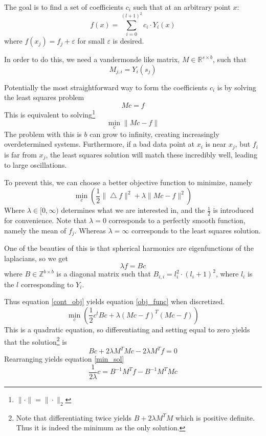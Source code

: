 \documentclass[12pt,a4paper]{article}
\newcommand{\eps}{\varepsilon}
\newcommand{\lap}{\bigtriangleup}
\begin{document}
The goal is to find a set of coefficients $c_i$ such that at an arbitrary point $x$:
\[
    f(x) = \sum_{i=0}^{(l+1)^2} c_i \cdot Y_i(x)
\]
where $f(x_j) = f_j + \eps$ for small $\eps$ is desired.

In order to do this, we need a vandermonde like matrix, $M \in \mathbb{R}^ {s \times b}$, such that
\[
    M_{j,i} = Y_i(s_j)
\]

Potentially the most straightforward way to form the coefficients $c_i$ is by solving
the least squares problem
\[
    M c = f
\]
This is equivalent to solving\footnote{$\|\cdot\| = \|\cdot\|_2$}
\[
    \min_c \| M c - f \|
\]
The problem with this is $b$ can grow to infinity, creating increasingly overdetermined
systems.
Furthermore, if a bad data point at $x_i$ is near $x_j$, but $f_i$ is far from $x_j$, the
least squares solution will match these incredibly well, leading to large oscillations.

To prevent this, we can choose a better objective function to minimize, namely
\begin{equation}\label{cont_obj}
    \min_c \left(\frac{1}{2}\| \lap f \|^2 + \lambda \| M c - f \|^2\right)
\end{equation}
Where $\lambda \in [0,\infty)$ determines what we are interested in,
and the $\frac{1}{2}$ is introduced for convenience.
Note that $\lambda = 0$ corresponds to a perfectly smooth function, namely
the mean of $f_j$.
Whereas $\lambda = \infty$ corresponds to the least squares solution.

One of the beauties of this is that spherical harmonics are eigenfunctions
of the laplacians, so we get
\[
    \lambda f = B c
\]
where $B \in \mathbb{Z}^{b \times b}$ is a diagonal matrix 
such that $B_{i,i} = l_i^2 \cdot (l_i+1)^2$,
where $l_i$ is the $l$ corresponding to $Y_i$.

Thus equation \ref{cont_obj} yields equation \ref{obj_func} when discretized.
\begin{equation}\label{obj_func}
    \min_c \left( \frac{1}{2} c^t B c + \lambda (Mc - f)^T (Mc - f) \right)
\end{equation}
This is a quadratic equation, so differentiating and setting equal to zero yields
that the solution\footnote{Note that differentiating twice yields $B + 2 \lambda M^T M$ which
is positive definite. Thus it is indeed the minimum as the only solution.} is
\[
    B c + 2 \lambda M^T M c - 2 \lambda M^T f = 0
\]
Rearranging yields equation \ref{min_sol}
\begin{equation}\label{min_sol}
    \dfrac{1}{2\lambda} c = B^{-1} M^T f - B^{-1} M^T M c
\end{equation}
\end{document}
